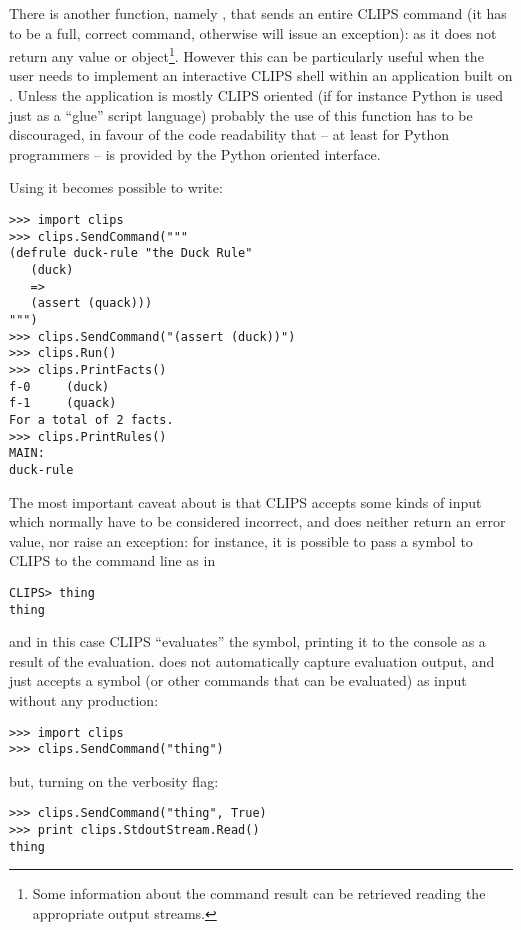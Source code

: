 There is another function, namely , that sends
an entire CLIPS command (it has to be a full, correct command, otherwise
\pyclips{} will issue an exception): as  it does not
return any value or object\footnote{Some information about the command
result can be retrieved reading the appropriate output streams.}.
However this can be particularly useful when the user needs to implement
an interactive CLIPS shell within an application built on \pyclips{}.
Unless the application is mostly CLIPS oriented (if for instance Python
is used just as a ``glue'' script language) probably the use of this
function has to be discouraged, in favour of the code readability that
-- at least for Python programmers -- is provided by the Python oriented
interface.

Using  it becomes possible to write:

\begin{verbatim}
>>> import clips
>>> clips.SendCommand("""
(defrule duck-rule "the Duck Rule"
   (duck)
   =>
   (assert (quack)))
""")
>>> clips.SendCommand("(assert (duck))")
>>> clips.Run()
>>> clips.PrintFacts()
f-0     (duck)
f-1     (quack)
For a total of 2 facts.
>>> clips.PrintRules()
MAIN:
duck-rule
\end{verbatim}

The most important caveat about  is that CLIPS
accepts some kinds of input which normally have to be considered
incorrect, and \pyclips{} does neither return an error value, nor raise
an exception: for instance, it is possible to pass a symbol to CLIPS to
the command line as in

\begin{verbatim}
CLIPS> thing
thing
\end{verbatim}

and in this case CLIPS ``evaluates'' the symbol, printing it to the
console as a result of the evaluation. \pyclips{} does not automatically
capture evaluation output, and just accepts a symbol (or other commands
that can be evaluated) as input without any production:

\begin{verbatim}
>>> import clips
>>> clips.SendCommand("thing")
\end{verbatim}

but, turning on the verbosity flag:

\begin{verbatim}
>>> clips.SendCommand("thing", True)
>>> print clips.StdoutStream.Read()
thing
\end{verbatim}

